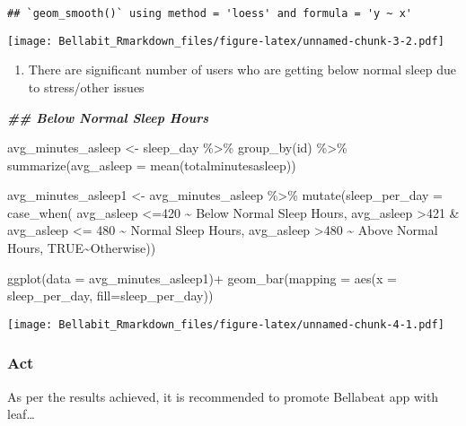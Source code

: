 \documentclass[
]{article}
\newenvironment{Shaded}{\begin{snugshade}}{\end{snugshade}}
\newcommand{\AttributeTok}[1]{\textcolor[rgb]{0.77,0.63,0.00}{#1}}
\newcommand{\ConstantTok}[1]{\textcolor[rgb]{0.00,0.00,0.00}{#1}}
\newcommand{\DecValTok}[1]{\textcolor[rgb]{0.00,0.00,0.81}{#1}}
\newcommand{\DocumentationTok}[1]{\textcolor[rgb]{0.56,0.35,0.01}{\textbf{\textit{#1}}}}
\newcommand{\FunctionTok}[1]{\textcolor[rgb]{0.00,0.00,0.00}{#1}}
\newcommand{\NormalTok}[1]{#1}
\newcommand{\OtherTok}[1]{\textcolor[rgb]{0.56,0.35,0.01}{#1}}
\newcommand{\SpecialCharTok}[1]{\textcolor[rgb]{0.00,0.00,0.00}{#1}}
\newcommand{\StringTok}[1]{\textcolor[rgb]{0.31,0.60,0.02}{#1}}
\providecommand{\tightlist}{%
  \setlength{\itemsep}{0pt}\setlength{\parskip}{0pt}}
\begin{document}
\begin{verbatim}
## `geom_smooth()` using method = 'loess' and formula = 'y ~ x'
\end{verbatim}

\texttt{[image: Bellabit\_Rmarkdown\_files/figure-latex/unnamed-chunk-3-2.pdf]}

\begin{enumerate}
\def\labelenumi{\arabic{enumi}.}
\setcounter{enumi}{3}
\tightlist
\item
  There are significant number of users who are getting below normal
  sleep due to stress/other issues
\end{enumerate}

\begin{Shaded}
\begin{Highlighting}[]
\DocumentationTok{\#\# Below Normal Sleep Hours}

\NormalTok{avg\_minutes\_asleep }\OtherTok{\textless{}{-}}\NormalTok{ sleep\_day }\SpecialCharTok{\%\textgreater{}\%}
  \FunctionTok{group\_by}\NormalTok{(id) }\SpecialCharTok{\%\textgreater{}\%}
  \FunctionTok{summarize}\NormalTok{(}\AttributeTok{avg\_asleep =} \FunctionTok{mean}\NormalTok{(totalminutesasleep))}


\NormalTok{avg\_minutes\_asleep1 }\OtherTok{\textless{}{-}}\NormalTok{ avg\_minutes\_asleep }\SpecialCharTok{\%\textgreater{}\%}
  \FunctionTok{mutate}\NormalTok{(}\AttributeTok{sleep\_per\_day =} \FunctionTok{case\_when}\NormalTok{(}
\NormalTok{    avg\_asleep }\SpecialCharTok{\textless{}=}\DecValTok{420} \SpecialCharTok{\textasciitilde{}} \StringTok{\textquotesingle{}Below Normal Sleep Hours\textquotesingle{}}\NormalTok{,}
\NormalTok{    avg\_asleep }\SpecialCharTok{\textgreater{}}\DecValTok{421} \SpecialCharTok{\&}\NormalTok{ avg\_asleep }\SpecialCharTok{\textless{}=} \DecValTok{480} \SpecialCharTok{\textasciitilde{}} \StringTok{\textquotesingle{}Normal Sleep Hours\textquotesingle{}}\NormalTok{,}
\NormalTok{    avg\_asleep }\SpecialCharTok{\textgreater{}}\DecValTok{480} \SpecialCharTok{\textasciitilde{}} \StringTok{\textquotesingle{}Above Normal Hours\textquotesingle{}}\NormalTok{,}
    \ConstantTok{TRUE}\SpecialCharTok{\textasciitilde{}}\StringTok{\textquotesingle{}Otherwise\textquotesingle{}}\NormalTok{))}

\FunctionTok{ggplot}\NormalTok{(}\AttributeTok{data =}\NormalTok{ avg\_minutes\_asleep1)}\SpecialCharTok{+}
  \FunctionTok{geom\_bar}\NormalTok{(}\AttributeTok{mapping =} \FunctionTok{aes}\NormalTok{(}\AttributeTok{x =}\NormalTok{ sleep\_per\_day, }\AttributeTok{fill=}\NormalTok{sleep\_per\_day))}
\end{Highlighting}
\end{Shaded}

\texttt{[image: Bellabit\_Rmarkdown\_files/figure-latex/unnamed-chunk-4-1.pdf]}

\hypertarget{act}{%
\subsubsection{Act}\label{act}}

As per the results achieved, it is recommended to promote Bellabeat app
with leaf\ldots{}
\end{document}

